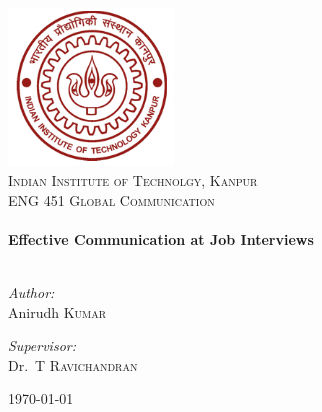 \begin{titlepage}

\begin{center}

\includegraphics[width=0.33\textwidth]{./logo}\\[1cm]    

\textsc{\LARGE Indian Institute of Technolgy, Kanpur}\\[1.5cm]

\textsc{\Large ENG 451 Global Communication}\\[0.5cm]


\HRule \\[0.4cm]
{ \huge \bfseries Effective Communication at Job Interviews}\\[0.4cm]

\HRule \\[1.5cm]

\begin{minipage}{0.4\textwidth}
\begin{flushleft} \large
\emph{Author:}\\
Anirudh \textsc{Kumar}
\end{flushleft}
\end{minipage}
\begin{minipage}{0.4\textwidth}
\begin{flushright} \large
\emph{Supervisor:} \\
Dr.~T \textsc{Ravichandran}
\end{flushright}
\end{minipage}

\vfill

{\large \today}

\end{center}

\end{titlepage}
